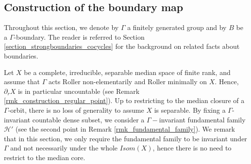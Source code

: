 \documentclass{amsart}
\numberwithin{equation}{section}
\newcommand{\HH}{\mathcal{H}}     %
\theoremstyle{definition}
\begin{document}
\subsection{Construction of the boundary map}\label{subsection_construction_boundary_map}

Throughout this section, we denote by $\Gamma$ a finitely generated group and by $B$ be a $\Gamma$-boundary. The reader is referred to Section \ref{section_strongboundaries_cocycles} for the background on related facts about boundaries.\par  Let $X$ be a complete, irreducible, separable median space of finite rank, and assume that $\Gamma$ acts Roller non-elementarily and Roller minimally on $X$. Hence, $\partial_r X$ is in particular uncountable (see Remark \ref{rmk_construction_regular_point}). Up to restricting to the median closure of a $\Gamma$-orbit, there is no loss of generality to assume $X$ is separable. By fixing a $\Gamma$-invariant countable dense subset, we consider a $\Gamma-$invariant fundamental family $\HH'$ (see the second point in Remark \ref{rmk_fundamental_family}). We remark that in this section, we only require the fundamental family to be invariant under $\Gamma$ and not necessarily under the whole $Isom(X)$, hence there is no need to restrict to the median core.
\end{document}
